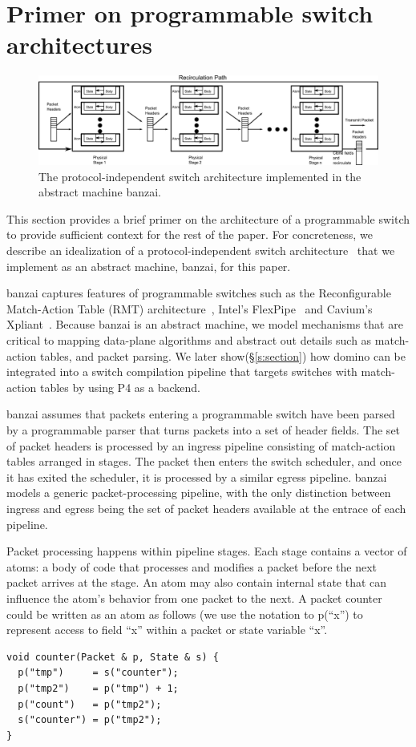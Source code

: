 \section{Primer on programmable switch architectures}
\label{s:architecture}

\begin{figure}[t]
\includegraphics[width=\textwidth]{p4_switch_model.pdf}
\caption{The protocol-independent switch architecture implemented in the
abstract machine banzai.}
\label{fig:architecture}
\end{figure}

This section provides a brief primer on the architecture of a programmable
switch to provide sufficient context for the rest of the paper. For
concreteness, we describe an idealization of a protocol-independent switch
architecture~\cite{pisa} that we implement as an abstract machine, banzai, for
this paper.

banzai captures features of programmable switches such as the Reconfigurable
Match-Action Table (RMT) architecture~\cite{rmt}, Intel's
FlexPipe~\cite{flexpipe} and Cavium's Xpliant~\cite{xpliant}. Because banzai is
an abstract machine, we model mechanisms that are critical to mapping
data-plane algorithms and abstract out details such as match-action tables, and
packet parsing. We later show(\S\ref{s:section}) how domino can be integrated
into a switch compilation pipeline that targets switches with match-action tables
by using P4 as a backend.

banzai assumes that packets entering a programmable switch have been  parsed by
a programmable parser that turns packets into a set of header fields. The set
of packet headers is processed by an ingress pipeline consisting of
match-action tables arranged in stages. The packet then enters the switch
scheduler, and once it has exited the scheduler, it is processed by a similar
egress pipeline. banzai models a generic packet-processing pipeline, with the
only distinction between ingress and egress being the set of packet headers
available at the entrace of each pipeline.

Packet processing happens within pipeline stages. Each stage contains a vector
of atoms: a body of code that processes and modifies a packet before the next
packet arrives at the stage.  An atom may also contain internal state that can
influence the atom's behavior from one packet to the next. A packet counter
could be written as an atom as follows (we use the notation to
p(``x'') to represent access to field ``x'' within a packet or state variable
``x''.
\begin{verbatim}
void counter(Packet & p, State & s) {
  p("tmp")     = s("counter");
  p("tmp2")    = p("tmp") + 1;
  p("count")   = p("tmp2");
  s("counter") = p("tmp2");
}
\end{verbatim}

